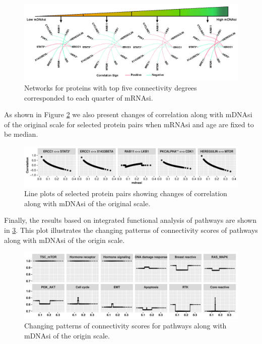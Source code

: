 \documentclass[
]{book}
\begin{document}
\begin{figure}

{\centering \includegraphics[width=0.9\linewidth]{images/mdna_network} 

}

\caption{Networks for proteins with top five connectivity degrees corresponded to each quarter of mRNAsi.}\label{fig:mdnasinet}
\end{figure}

As shown in Figure \ref{fig:mdnasiline} we also present changes of correlation along with mDNAsi of the original scale for selected protein pairs when mRNAsi and age are fixed to be median.

\begin{figure}

{\centering \includegraphics[width=0.9\linewidth]{images/dna_line} 

}

\caption{Line plots of selected protein pairs showing changes of correlation along with mDNAsi of the original scale.}\label{fig:mdnasiline}
\end{figure}

Finally, the results based on integrated functional analysis of pathways are shown in \ref{fig:mdnasipathway}. This plot illustrates the changing patterns of connectivity scores of pathways along with mDNAsi of the origin scale.

\begin{figure}

{\centering \includegraphics[width=0.9\linewidth]{images/mdna_cs_line} 

}

\caption{Changing patterns of connectivity scores for pathways along with mDNAsi of the origin scale.}\label{fig:mdnasipathway}
\end{figure}
\end{document}
